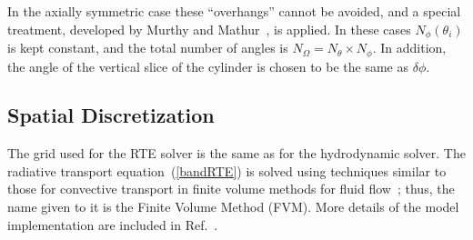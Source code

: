 In the axially symmetric case these ``overhangs'' cannot be avoided, and a
special treatment, developed by Murthy and Mathur~\cite{Murthy}, is
applied. In these cases $N_{\phi}(\theta_i)$ is kept constant, and
the total number of angles is $N_{\Omega} = N_{\theta} \times
N_{\phi}$. In addition, the angle of the vertical slice of the cylinder is
chosen to be the same as $\delta\phi$.



\subsection{Spatial Discretization}


The grid used for the RTE solver is the same as for the hydrodynamic solver. The radiative transport equation~(\ref{bandRTE}) is solved using
techniques similar to those for convective transport in finite volume methods for fluid flow~\cite{Raithby}; thus, the name given to it is
the Finite Volume Method (FVM). More details of the model implementation are included in Ref.~\cite{Hostikka:2008}.

